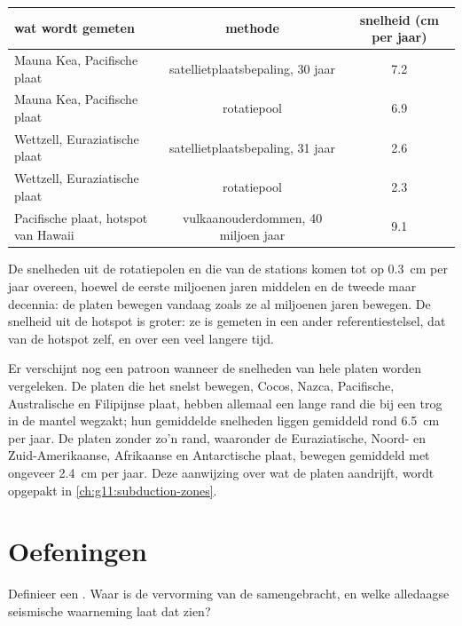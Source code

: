 \begin{center}
\small
\begin{tabular}{|l|c|c|}
\hline
wat wordt gemeten & methode & snelheid (\unit{cm} per jaar) \\ \hline
Mauna Kea, Pacifische plaat & satellietplaatsbepaling, 30 jaar & 7.2 \\
Mauna Kea, Pacifische plaat & rotatiepool & 6.9 \\
Wettzell, Euraziatische plaat & satellietplaatsbepaling, 31 jaar & 2.6 \\
Wettzell, Euraziatische plaat & rotatiepool & 2.3 \\
Pacifische plaat, hotspot van Hawaii & vulkaanouderdommen, 40 miljoen jaar & 9.1 \\ \hline
\end{tabular}
\end{center}

De snelheden uit de rotatiepolen en die van de stations komen tot op
\qty{0.3}{cm} per jaar overeen, hoewel de eerste miljoenen jaren middelen en de
tweede maar decennia: de platen bewegen vandaag zoals ze al miljoenen jaren
bewegen. De snelheid uit de hotspot is groter: ze is gemeten in een ander
referentiestelsel, dat van de hotspot zelf, en over een veel langere tijd.

Er verschijnt nog een patroon wanneer de snelheden van hele platen worden
vergeleken. De platen die het snelst bewegen, Cocos, Nazca, Pacifische,
Australische en Filipijnse plaat, hebben allemaal een lange rand die bij een trog
in de mantel wegzakt; hun gemiddelde snelheden liggen gemiddeld rond
\qty{6.5}{cm} per jaar. De platen zonder zo'n rand, waaronder de Euraziatische,
Noord- en Zuid-Amerikaanse, Afrikaanse en Antarctische plaat, bewegen gemiddeld
met ongeveer \qty{2.4}{cm} per jaar. Deze aanwijzing over wat de platen aandrijft,
wordt opgepakt in \cref{ch:g11:subduction-zones}.

\section{Oefeningen}

\begin{exercise}[$\star$]\label{exo:g11:plate-motions:1}
Definieer een . Waar is de vervorming van de 
samengebracht, en welke alledaagse seismische waarneming laat dat zien?
\end{exercise}

